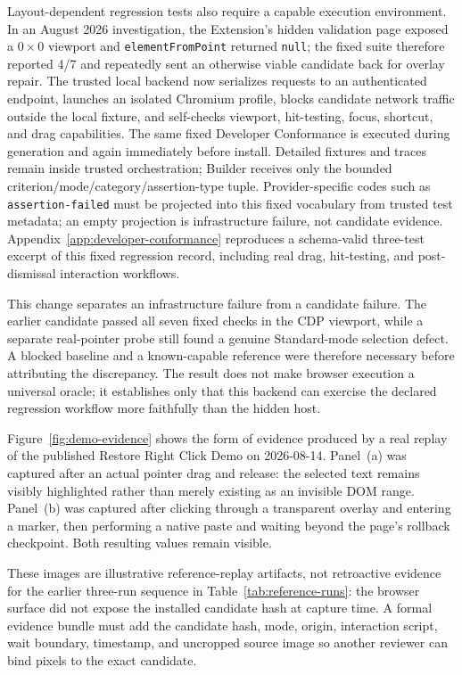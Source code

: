 \documentclass[10pt]{article}
\begin{document}
Layout-dependent regression tests also require a capable execution environment. In an
August 2026 investigation, the Extension's hidden validation page exposed a $0\times0$
viewport and \texttt{elementFromPoint} returned \texttt{null}; the fixed suite therefore
reported 4/7 and repeatedly sent an otherwise viable candidate back for overlay repair. The
trusted local backend now serializes requests to an authenticated endpoint, launches an
isolated Chromium profile, blocks candidate network traffic outside the local fixture, and
self-checks viewport, hit-testing, focus, shortcut, and drag capabilities. The same fixed
Developer Conformance is executed during generation and again immediately before install.
Detailed fixtures and traces remain inside trusted orchestration; Builder receives only the
bounded criterion/mode/category/assertion-type tuple. Provider-specific codes such as
\texttt{assertion-failed} must be projected into this fixed vocabulary from trusted test
metadata; an empty projection is infrastructure failure, not candidate evidence.
Appendix~\ref{app:developer-conformance} reproduces a
schema-valid three-test excerpt of this fixed regression record, including real drag,
hit-testing, and post-dismissal interaction workflows.

This change separates an infrastructure failure from a candidate failure. The earlier
candidate passed all seven fixed checks in the CDP viewport, while a separate real-pointer
probe still found a genuine Standard-mode selection defect. A blocked baseline and a
known-capable reference were therefore necessary before attributing the discrepancy. The
result does not make browser execution a universal oracle; it establishes only that this
backend can exercise the declared regression workflow more faithfully than the hidden host.

Figure~\ref{fig:demo-evidence} shows the form of evidence produced by a real replay of
the published Restore Right Click Demo on 2026-08-14. Panel~(a) was captured after an
actual pointer drag and release: the selected text remains visibly highlighted rather
than merely existing as an invisible DOM range. Panel~(b) was captured after clicking
through a transparent overlay and entering a marker, then performing a native paste and
waiting beyond the page's rollback checkpoint. Both resulting values remain visible.

These images are illustrative reference-replay artifacts, not retroactive evidence for
the earlier three-run sequence in Table~\ref{tab:reference-runs}: the browser surface did
not expose the installed candidate hash at capture time. A formal evidence bundle must
add the candidate hash, mode, origin, interaction script, wait boundary, timestamp, and
uncropped source image so another reviewer can bind pixels to the exact candidate.
\end{document}

